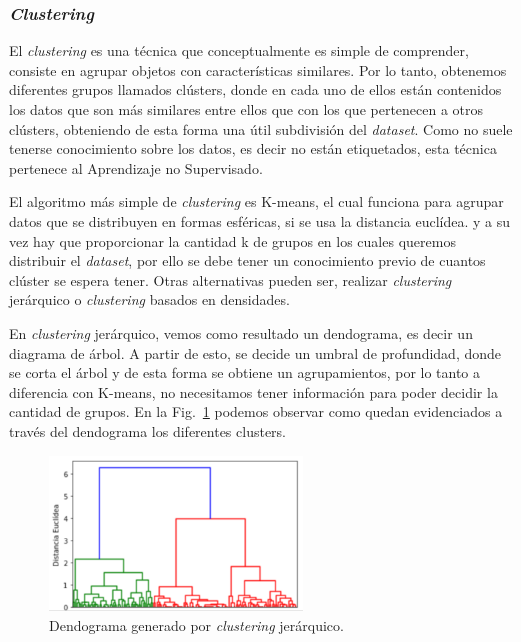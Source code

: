 \documentclass[a4paper,12pt]{article}
\begin{document}
\clearpage

\subsubsection{\textit{Clustering}}

El \textit{clustering} es una técnica que conceptualmente es simple de comprender, consiste en agrupar objetos con características similares. Por lo tanto, obtenemos diferentes grupos llamados clústers, donde en cada uno de ellos están contenidos los datos que son más similares entre ellos que con los que pertenecen a otros clústers, obteniendo de esta forma una útil subdivisión del \textit{dataset}. Como no suele tenerse conocimiento sobre los datos, es decir no están etiquetados, esta técnica pertenece al Aprendizaje no Supervisado.

El algoritmo más simple de \textit{clustering} es K-means, el cual funciona para agrupar datos que se distribuyen en formas esféricas, si se usa la distancia euclídea. y a su vez hay que proporcionar la cantidad k de grupos en los cuales queremos distribuir el \textit{dataset}, por ello se debe tener un conocimiento previo de cuantos clúster se espera tener. 
Otras alternativas pueden ser, realizar \textit{clustering} jerárquico o \textit{clustering} basados en densidades.

En \textit{clustering} jerárquico, vemos como resultado un dendograma, es decir un diagrama de árbol. A partir de esto, se decide un umbral de profundidad, donde se corta el árbol y  de esta forma se obtiene un agrupamientos, por lo tanto a diferencia con K-means, no necesitamos tener información para poder decidir la cantidad de grupos. En la Fig.~\ref{fig:dendogram.} podemos observar como quedan evidenciados a través del dendograma los diferentes clusters.

\begin{figure}[H]
	\begin{center}				
		\includegraphics[width=0.6\textwidth]{tesis_16.png}
		\caption{Dendograma generado por \textit{clustering} jerárquico.}
		\label{fig:dendogram.}
	\end{center}
\end{figure}
\end{document}
